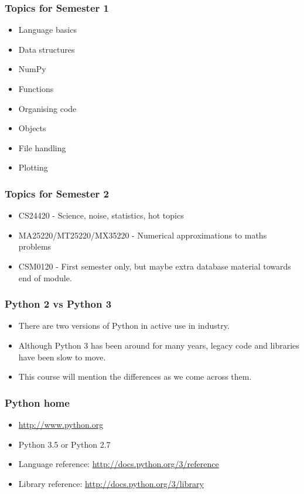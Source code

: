 \documentclass{beamer}
\begin{document}
\begin{frame}
\frametitle{Topics for Semester 1}
\begin{itemize}
\item Language basics
\item Data structures
\item NumPy
\item Functions
\item Organising code
\item Objects
\item File handling
\item Plotting
\end{itemize}
\end{frame}

\begin{frame}
\frametitle{Topics for Semester 2}
\begin{itemize}
\item CS24420 - Science, noise, statistics, hot topics
\item MA25220/MT25220/MX35220 - Numerical approximations to maths problems
\item CSM0120 - First semester only, but maybe extra database material
  towards end of module.
\end{itemize}
\end{frame}



\begin{frame}
\frametitle{Python 2 vs Python 3}
\begin{itemize}
\item There are two versions of Python in active use in industry.
\item Although Python 3 has been around for many years, legacy code
  and libraries
  have been slow to move.
\item This course will mention the differences as we come across them.
\end{itemize}
\end{frame}

\begin{frame}
\frametitle{Python home}
\begin{itemize}
\item \url{http://www.python.org}
\item Python 3.5 or Python 2.7
\item Language reference: \url{http://docs.python.org/3/reference}
\item Library reference: \url{http://docs.python.org/3/library}
\end{itemize}
\end{frame}
\end{document}
